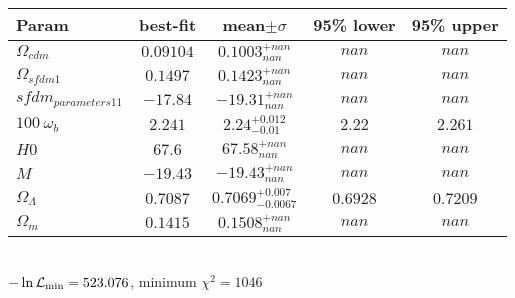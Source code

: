 \begin{tabular}{|l|c|c|c|c|} 
 \hline 
Param & best-fit & mean$\pm\sigma$ & 95\% lower & 95\% upper \\ \hline 
$\Omega_{cdm }$ &$0.09104$ & $0.1003_{nan}^{+nan}$ & $nan$ & $nan$ \\ 
$\Omega_{sfdm 1 }$ &$0.1497$ & $0.1423_{nan}^{+nan}$ & $nan$ & $nan$ \\ 
$sfdm_{parameters 1  1 }$ &$-17.84$ & $-19.31_{nan}^{+nan}$ & $nan$ & $nan$ \\ 
$100~\omega_{b }$ &$2.241$ & $2.24_{-0.01}^{+0.012}$ & $2.22$ & $2.261$ \\ 
$H0$ &$67.6$ & $67.58_{nan}^{+nan}$ & $nan$ & $nan$ \\ 
$M$ &$-19.43$ & $-19.43_{nan}^{+nan}$ & $nan$ & $nan$ \\ 
$\Omega_{\Lambda }$ &$0.7087$ & $0.7069_{-0.0067}^{+0.007}$ & $0.6928$ & $0.7209$ \\ 
$\Omega_{m }$ &$0.1415$ & $0.1508_{nan}^{+nan}$ & $nan$ & $nan$ \\ 
\hline 
 \end{tabular} \\ 
$-\ln{\cal L}_\mathrm{min} =523.076$, minimum $\chi^2=1046$ \\ 
